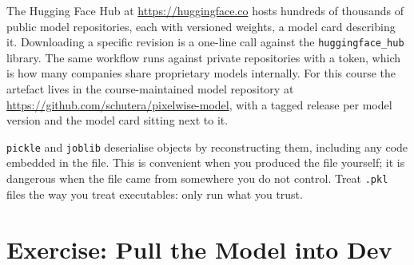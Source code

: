 The Hugging Face Hub at \url{https://huggingface.co} hosts hundreds of
thousands of public model repositories, each with versioned weights,
a model card describing it.
Downloading a specific revision is a one-line call against the
\texttt{huggingface\_hub} library.
The same workflow runs against private repositories with a token, which
is how many companies share proprietary models internally.
For this course the artefact lives in the course-maintained model repository
at \url{https://github.com/schutera/pixelwise-model}, with a tagged release
per model version and the model card sitting next to it.



\texttt{pickle} and \texttt{joblib} deserialise objects by reconstructing
them, including any code embedded in the file.
This is convenient when you produced the file yourself; it is dangerous
when the file came from somewhere you do not control.
Treat \texttt{.pkl} files the way you treat executables: only run what you
trust.




\newpage
\section{Exercise: Pull the Model into Dev}





